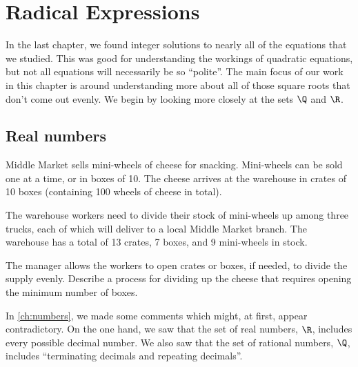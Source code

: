 \chapter{Radical Expressions}
\label{ch:radicals}

\newcommand*\rfrac[2]{{}^{#1}\!/_{#2}}


In the last chapter, we found integer solutions to nearly all of the equations that we studied. This was good for understanding the workings of quadratic equations, but not all equations will necessarily be so ``polite''. The main focus of our work in this chapter is around understanding more about all of those square roots that don't come out evenly. We begin by looking more closely at the sets $\Q$ and $\R$.

\section{Real numbers}
\label{sec:radrealnumbers}

\begin{boxedexplore}
Middle Market sells mini-wheels of cheese for snacking. Mini-wheels can be sold one at a time, or in boxes of 10. The cheese arrives at the warehouse in crates of 10 boxes (containing 100 wheels of cheese in total).

The warehouse workers need to divide their stock of mini-wheels up among three trucks, each of which will deliver to a local Middle Market branch. The warehouse has a total of 13 crates, 7 boxes, and 9 mini-wheels in stock.

The manager allows the workers to open crates or boxes, if needed, to divide the supply evenly. Describe a process for dividing up the cheese that requires opening the minimum number of boxes.
\end{boxedexplore}

In \cref{ch:numbers}, we made some comments which might, at first, appear contradictory. On the one hand, we saw that the set of real numbers, $\R$, includes every possible decimal number. We also saw that the set of rational numbers, $\Q$, includes ``terminating decimals and repeating decimals''. 

